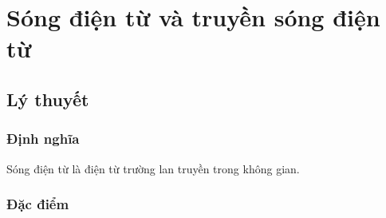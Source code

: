 \let\lesson\undefined
\newcommand{\lesson}{\phantomlesson{Bài 22: Sóng điện từ}}
\chapter[Sóng điện từ và truyền sóng điện từ]{Sóng điện từ và truyền sóng điện từ}
\section{Lý thuyết}
\subsection{Định nghĩa}
Sóng điện từ là điện từ trường lan truyền trong không gian.
\subsection {Đặc điểm}
